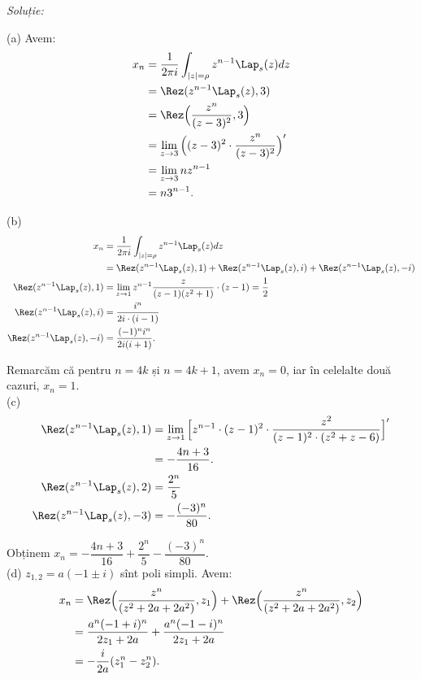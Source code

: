 \emph{Soluție:}

(a) Avem:
\begin{align*}
  x_n &= \dfrac{1}{2\pi i} \int_{|z| = \rho} z^{n-1} \Lap_s (z) dz \\
      &= \Rez(z^{n-1} \Lap_s(z), 3) \\
      &= \Rez \Big( \dfrac{z^n}{(z-3)^2}, 3 \Big) \\
      &= \lim_{z \to 3} \Big( (z-3)^2 \cdot \dfrac{z^n}{(z-3)^2} \Big)^{\prime} \\
      &= \lim_{z \to 3} nz^{n-1} \\
      &= n3^{n-1}.
\end{align*}

(b)
\begin{align*}
  x_n &= \dfrac{1}{2 \pi i} \int_{|z| = \rho} z^{n-1} \Lap_s(z) dz \\
      &= \Rez(z^{n-1} \Lap_s (z), 1) + \Rez(z^{n-1} \Lap_s(z), i) + 
        \Rez(z^{n-1} \Lap_s(z), -i) \\
  \Rez(z^{n-1}\Lap_s(z),1) &= \lim_{z \to 1} z^{n-1} \dfrac{z}{(z - 1)(z^2 + 1)} 
                             \cdot (z-1) = \dfrac{1}{2} \\
  \Rez(z^{n-1} \Lap_s(z), i) &= \dfrac{i^n}{2i \cdot (i-1)} \\
  \Rez(z^{n-1} \Lap_s(z), -i) &= \dfrac{(-1)^n i^n}{2i(i+1)}.
\end{align*}

Remarcăm că pentru $n = 4k$ și $n = 4k+1$, avem $x_n = 0$, iar în celelalte 
două cazuri, $x_n = 1$. \\

(c)
\begin{align*}
  \Rez(z^{n-1} \Lap_s(z), 1) &= \lim_{z\to 1} \Big[ z^{n-1} \cdot (z-1)^2 \cdot 
                               \dfrac{z^2}{(z-1)^2 \cdot (z^2 + z - 6)} \Big]^{\prime}\\
                             &= - \dfrac{4n + 3}{16}. \\
  \Rez(z^{n-1} \Lap_s(z), 2) &= \dfrac{2^n}{5} \\
  \Rez(z^{n-1} \Lap_s(z), -3) &= -\dfrac{(-3)^n}{80}.
\end{align*}

Obținem $x_n = - \dfrac{4n+3}{16} + \dfrac{2^n}{5} - \dfrac{(-3)^n}{80}$. \\

(d) $z_{1,2} = a (-1 \pm i)$ sînt poli simpli. Avem:
\begin{align*}
  x_n &= \Rez\Big( \dfrac{z^n}{(z^2 + 2a + 2a^2)}, z_1 \Big) + 
        \Rez\Big(  \dfrac{z^n}{(z^2 + 2a + 2a^2)}, z_2 \Big) \\
      &= \dfrac{a^n(-1 + i)^n}{2z_1 + 2a} + \dfrac{a^n(-1-i)^n}{2z_1 + 2a} \\
      &= -\dfrac{i}{2a}(z_1^n - z_2^n).
\end{align*}

